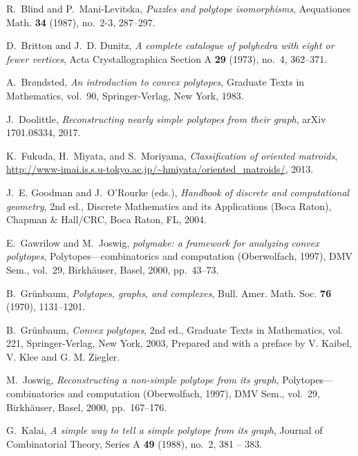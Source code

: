 \documentclass[a4paper]{amsart}
\theoremstyle{definition}
\theoremstyle{remark}
\begin{document}
\begin{thebibliography}{10}

R.~Blind and P.~Mani-Levitska, \emph{Puzzles and polytope isomorphisms},
  Aequationes Math. \textbf{34} (1987), no.~2-3, 287--297. 

D.~Britton and J.~D. Dunitz, \emph{A complete catalogue of polyhedra with eight
  or fewer vertices}, Acta Crystallographica Section A \textbf{29} (1973),
  no.~4, 362--371.

A.~Br{\o}ndsted, \emph{An introduction to convex polytopes}, Graduate Texts in
  Mathematics, vol.~90, Springer-Verlag, New York, 1983. 

J.~Doolittle, \emph{Reconstructing nearly simple polytopes from their graph},
  arXiv 1701.08334, 2017.

K.~Fukuda, H.~Miyata, and S.~Moriyama, \emph{Classification of oriented
  matroids},
  \url{http://www-imai.is.s.u-tokyo.ac.jp/~hmiyata/oriented_matroids/}, 2013.

J.~E. Goodman and J.~O'Rourke (eds.), \emph{Handbook of discrete and
  computational geometry}, 2nd ed., Discrete Mathematics and its Applications
  (Boca Raton), Chapman \& Hall/CRC, Boca Raton, FL, 2004. 

E.~Gawrilow and M.~Joswig, \emph{polymake: a framework for analyzing convex
  polytopes}, Polytopes---combinatorics and computation ({O}berwolfach, 1997),
  DMV Sem., vol.~29, Birkh\"auser, Basel, 2000, pp.~43--73. 

B.~Gr{\"u}nbaum, \emph{Polytopes, graphs, and complexes}, Bull. Amer. Math.
  Soc. \textbf{76} (1970), 1131--1201. 

B.~Gr{{\"u}}nbaum, \emph{Convex polytopes}, 2nd ed., Graduate Texts in
  Mathematics, vol. 221, Springer-Verlag, New York, 2003, Prepared and with a
  preface by V. Kaibel, V. Klee and G. M. Ziegler. 

M.~Joswig, \emph{Reconstructing a non-simple polytope from its graph},
  Polytopes---combinatorics and computation ({O}berwolfach, 1997), DMV Sem.,
  vol.~29, Birkh\"auser, Basel, 2000, pp.~167--176. 

G.~Kalai, \emph{A simple way to tell a simple polytope from its graph}, Journal
  of Combinatorial Theory, Series A \textbf{49} (1988), no.~2, 381 -- 383.


\end{thebibliography}
\end{document}
